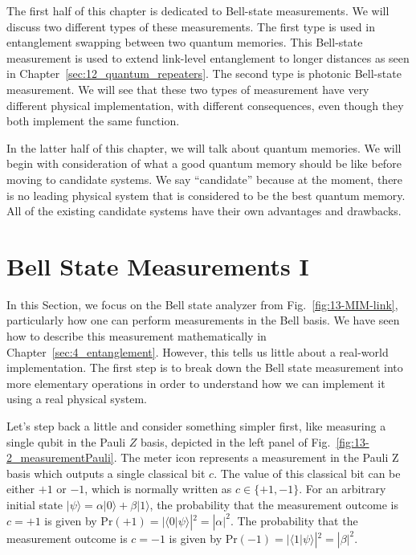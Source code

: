 The first half of this chapter is dedicated to Bell-state measurements.
We will discuss two different types of these measurements.
The first type is used in entanglement swapping between two quantum memories.
This Bell-state measurement is used to extend link-level entanglement to longer distances as seen in Chapter~\ref{sec:12_quantum_repeaters}.
The second type is photonic Bell-state measurement.
We will see that these two types of measurement have very different physical implementation, with different consequences, even though they both implement the same function.

In the latter half of this chapter, we will talk about quantum memories.
We will begin with consideration of what a good quantum memory should be like before moving to candidate systems.
We say ``candidate'' because at the moment, there is no leading physical system that is considered to be the best quantum memory. All of the existing candidate systems have their own advantages and drawbacks.


\section{Bell State Measurements I}
\label{sec:bell-state-measurements-I}

In this Section, we focus on the Bell state analyzer from Fig.~\ref{fig:13-MIM-link}, particularly how one can perform measurements in the Bell basis.
We have seen how to describe this measurement mathematically in Chapter~\ref{sec:4_entanglement}.
However, this tells us little about a real-world implementation.
The first step is to break down the Bell state measurement into more elementary operations in order to understand how we can implement it using a real physical system.

Let's step back a little and consider something simpler first, like measuring a single qubit in the Pauli $Z$ basis, depicted in the left panel of Fig.~\ref{fig:13-2_measurementPauli}.
The meter icon represents a measurement in the Pauli Z basis which outputs a single classical bit $c$.
The value of this classical bit can be either $+1$ or $-1$, which is normally written as $c\in\{+1,-1\}$.
For an arbitrary initial state $|\psi\rangle = \alpha |0\rangle + \beta |1\rangle$, the probability that the measurement outcome is $c=+1$ is given by $\text{Pr}(+1)=|\langle0|\psi\rangle|^2=|\alpha|^2$.
The probability that the measurement outcome is $c=-1$ is given by $\text{Pr}(-1)=|\langle1|\psi\rangle|^2=|\beta|^2$.

